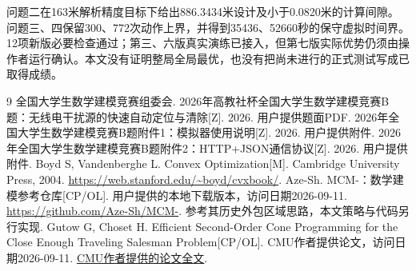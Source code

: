 \documentclass[UTF8,a4paper,zihao=-4,fontset=windows]{ctexart}
\begin{document}
问题二在163米解析精度目标下给出886.3434米设计及小于0.0820米的计算间隙。问题三、四保留300、772次动作上界，并得到35436、52660秒的保守虚拟时间界。12项新版必要检查通过；第三、六版真实演练已接入，但第七版实际优势仍须由操作者运行确认。本文没有证明整局全局最优，也没有把尚未进行的正式测试写成已取得成绩。

\begingroup\small
\begin{thebibliography}{9}\setlength{\itemsep}{0pt}
 全国大学生数学建模竞赛组委会. 2026年高教社杯全国大学生数学建模竞赛B题：无线电干扰源的快速自动定位与清除[Z]. 2026. 用户提供题面PDF.
 2026年全国大学生数学建模竞赛B题附件1：模拟器使用说明[Z]. 2026. 用户提供附件.
 2026年全国大学生数学建模竞赛B题附件2：HTTP+JSON通信协议[Z]. 2026. 用户提供附件.
 Boyd S, Vandenberghe L. Convex Optimization[M]. Cambridge University Press, 2004. \url{https://web.stanford.edu/~boyd/cvxbook/}.
 Aze-Sh. MCM-：数学建模参考仓库[CP/OL]. 用户提供的本地下载版本，访问日期2026-09-11. \url{https://github.com/Aze-Sh/MCM-}. 参考其历史外包区域思路，本文策略与代码另行实现.
 Gutow G, Choset H. Efficient Second-Order Cone Programming for the Close Enough Traveling Salesman Problem[CP/OL]. CMU作者提供论文，访问日期2026-09-11. \href{https://biorobotics.ri.cmu.edu/papers/paperUploads/Efficient_SOCP_for_the_CETSP_ICRA_2025_v5_Geordan.pdf}{CMU作者提供的论文全文}.
\end{thebibliography}\endgroup

\clearpage
\appendix
\end{document}
